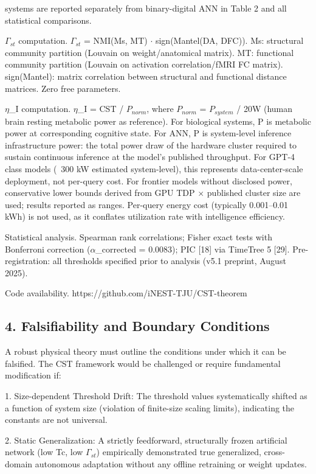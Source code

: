 \documentclass[a4paper,12pt]{article}
\begin{document}
\dagNMH systems are reported separately from binary-digital ANN in Table 2 and all statistical comparisons.


$\Gamma_{st}$ computation. $\Gamma_{st}$ = NMI(Ms, MT) $\cdot$ sign(Mantel(DA, DFC)). Ms: structural community partition (Louvain on weight/anatomical matrix). MT: functional community partition (Louvain on activation correlation/fMRI FC matrix). sign(Mantel): matrix correlation between structural and functional distance matrices. Zero free parameters.


$\eta$_I computation. $\eta$_I = CST / $P_{norm}$, where $P_{norm}$ = $P_{system}$ / 20W (human brain resting metabolic power as reference).
For biological systems, P is metabolic power at corresponding cognitive state.
For ANN, P is system-level inference infrastructure power: the total power draw of the hardware cluster required to sustain continuous inference at the model's published throughput.
For GPT-4 class models (~300 kW estimated system-level), this represents data-center-scale deployment, not per-query cost.
For frontier models without disclosed power, conservative lower bounds derived from GPU TDP $\times$ published cluster size are used; results reported as ranges.
Per-query energy cost (typically 0.001--0.01 kWh) is not used, as it conflates utilization rate with intelligence efficiency.


Statistical analysis. Spearman rank correlations; Fisher exact tests with Bonferroni correction ($\alpha$_corrected = 0.0083); PIC [18] via TimeTree 5 [29]. Pre-registration: all thresholds specified prior to analysis (v5.1 preprint, August 2025).


Code availability. https://github.com/iNEST-TJU/CST-theorem



\subsection{4. Falsifiability and Boundary Conditions}

A robust physical theory must outline the conditions under which it can be falsified. The CST framework would be challenged or require fundamental modification if:


1. Size-dependent Threshold Drift: The threshold values systematically shifted as a function of system size (violation of finite-size scaling limits), indicating the constants are not universal.


2. Static Generalization: A strictly feedforward, structurally frozen artificial network (low Tc, low $\Gamma_{st}$) empirically demonstrated true generalized, cross-domain autonomous adaptation without any offline retraining or weight updates.
\end{document}
